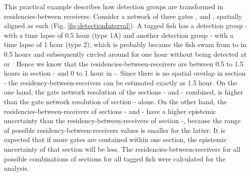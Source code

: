 This practical example describes how detection groups are transformed in residencies-between receivers: Consider a network of three gates ,  and , spatially aligned as such (Fig. \ref{fig:detectionInterval}). A tagged fish has a detection group - with a time lapse of 0.5 hour (type 1A) and another detection group - with a time lapse of 1 hour (type 2), which is probably because the fish swam from  to  in 0.5 hours and subsequently circled around  for one hour without being detected at  or . Hence we know that the residencies-between-receivers are between 0.5 to 1.5 hours in section - and 0 to 1 hour in -. Since there is no spatial overlap in section - the residency-between-receivers can be estimated exactly as 1.5 hour. On the one hand, the gate network resolution of the sections - and - combined, is higher than the gate network resolution of section - alone. On the other hand, the residencies-between-receivers of sections - and - have a higher epistemic uncertainty than the residency-between-receivers of section -, because the range of possible residency-between-receivers values is smaller for the latter. It is expected that if more gates are contained within one section, the epistemic uncertainty of that section will be less. The residencies-between-receivers for all possible combinations of sections for all tagged fish were calculated for the analysis.  

